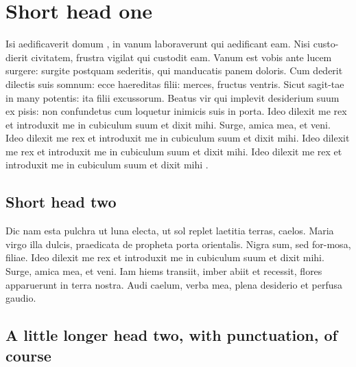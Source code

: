 \documentclass{arkiv}
\begin{document}

\section{Short head one} %

Isi aedificaverit domum \cite{SM},
in vanum \cite{BP12} laboraverunt qui aedificant eam.
Nisi custo-dierit civitatem, frustra vigilat qui custodit eam. Vanum
est vobis ante lucem surgere: surgite postquam sederitis, qui
manducatis panem doloris. Cum dederit dilectis suis somnum: ecce
haereditas filii: merces, fructus ventris. Sicut sagit-tae in many
potentis: ita filii excussorum. Beatus vir qui implevit desiderium
suum ex pisis: non confundetus cum loquetur inimicis suis in porta.
Ideo dilexit me rex et introduxit me in cubiculum suum et dixit
mihi.
Surge, amica mea, et veni.
Ideo dilexit me rex et introduxit me in cubiculum suum et dixit
mihi.
Ideo dilexit me rex et introduxit me in cubiculum suum et dixit
mihi.
Ideo dilexit me rex et introduxit me in cubiculum suum et dixit
mihi \cite{SM}.


\subsection{Short head two}\label{sec1.1}%

Dic nam esta pulchra ut luna electa, ut sol replet laetitia terras,
caelos. Maria virgo illa dulcis, praedicata de propheta porta
orientalis. Nigra sum, sed for-mosa, filiae. Ideo dilexit me rex et
introduxit me in cubiculum suum et dixit mihi. Surge, amica mea, et
veni. Iam hiems transiit, imber abiit et recessit, flores apparuerunt in
terra nostra. Audi caelum, verba mea, plena desiderio et perfusa gaudio.


\subsection{A little longer head two, with punctuation, of course}\label{sec1.2}%
\end{document}
